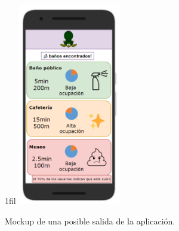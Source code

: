 \documentclass[13pt,a4paper]{article}
\makeatletter
\newcommand*{\centerfloat}{%
  \parindent \z@
  \leftskip \z@ \@plus 1fil \@minus \textwidth
  \rightskip\leftskip
  \parfillskip \z@skip}
\makeatother
\begin{document}

\begin{figure}[H]
  \centerfloat
  \includegraphics[width=0.4\textwidth]{img/4.png}
  \caption{Mockup de una posible salida de la aplicación.}
  \label{output}
\end{figure}





    \setlength{\parskip}{1em}
    \newpage
\end{document}

